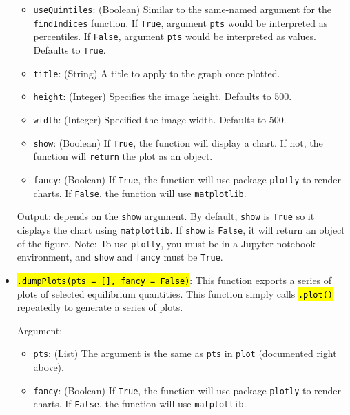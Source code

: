 \documentclass[12pt]{article}
\DeclareRobustCommand{\hlCODE}[1]{{\sethlcolor{backcolour}\hl{#1}}}
\begin{document}
\begin{itemize}
\begin{itemize}
            \item \texttt{useQuintiles}: (Boolean) Similar to the same-named argument for the
            \texttt{findIndices} function. If \texttt{True}, argument \texttt{pts} would be interpreted as percentiles. If \texttt{False}, argument \texttt{pts} would be interpreted as values. Defaults to \texttt{True}.
            \item \texttt{title}: (String) A title to apply to the graph once
            plotted.
            \item \texttt{height}: (Integer) Specifies the image height. Defaults
            to 500.
            \item \texttt{width}: (Integer) Specified the image width. Defaults
            to 500.
            \item \texttt{show}: (Boolean) If \texttt{True}, the function will display a chart. If not, the function will \texttt{return} the plot as an object.
            \item \texttt{fancy}: (Boolean) If \texttt{True}, the function will use package \texttt{plotly} to render charts. If \texttt{False}, the function will use \texttt{matplotlib}.

        \end{itemize}
        
        Output: depends on the \texttt{show} argument. By default, \texttt{show} is \texttt{True} so it displays the chart using \texttt{matplotlib}. If \texttt{show} is \texttt{False}, it will return an object of the figure. Note: To use \texttt{plotly}, you must be in a Jupyter notebook environment, and \texttt{show} and \texttt{fancy} must be \texttt{True}.
        
       \item \hlCODE{\texttt{.dumpPlots(pts = [], fancy = False)}}: This function exports a series of plots of selected equilibrium quantities. This function simply calls \hlCODE{\texttt{.plot()}} repeatedly to generate a series of plots.
       
       Argument: 
       \begin{itemize}
              \item \texttt{pts}: (List) The argument is the same as \texttt{pts} in \texttt{plot} (documented right above).
            \item \texttt{fancy}: (Boolean) If \texttt{True}, the function will use package \texttt{plotly} to render charts. If \texttt{False}, the function will use \texttt{matplotlib}.
       \end{itemize}


\end{itemize}
\end{document}
